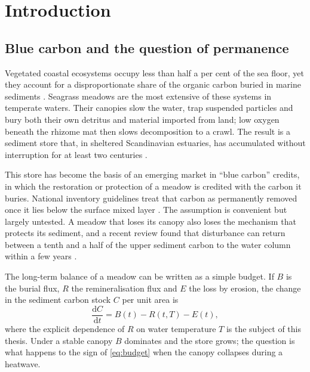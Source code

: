 \chapter{Introduction}
\label{ch:introduction}


\section{Blue carbon and the question of permanence}
\label{sec:permanence}

Vegetated coastal ecosystems occupy less than half a per cent of the sea
floor, yet they account for a disproportionate share of the organic
carbon buried in marine sediments \parencite{rowan2017seagrass}. Seagrass
meadows are the most extensive of these systems in temperate waters. Their
canopies slow the water, trap suspended particles and bury both their own
detritus and material imported from land; low oxygen beneath the rhizome
mat then slows decomposition to a crawl. The result is a sediment store
that, in sheltered Scandinavian estuaries, has accumulated without
interruption for at least two centuries \parencite{holmgren2019burial}.

This store has become the basis of an emerging market in \enquote{blue
carbon} credits, in which the restoration or protection of a meadow is
credited with the carbon it buries. National inventory guidelines treat
that carbon as permanently removed once it lies below the surface mixed
layer \parencite{bcwg2023guidelines}. The assumption is convenient but
largely untested. A meadow that loses its canopy also loses the
mechanism that protects its sediment, and a recent review found that
disturbance can return between a tenth and a half of the upper sediment
carbon to the water column within a few years
\parencite{fairbairn2022permanence}.

The long-term balance of a meadow can be written as a simple budget. If
\(B\) is the burial flux, \(R\) the remineralisation flux and \(E\) the
loss by erosion, the change in the sediment carbon stock \(C\) per unit
area is
\begin{equation}
  \frac{\mathrm{d}C}{\mathrm{d}t} = B(t) - R(t, T) - E(t),
  \label{eq:budget}
\end{equation}
where the explicit dependence of \(R\) on water temperature \(T\) is the
subject of this thesis. Under a stable canopy \(B\) dominates and the
store grows; the question is what happens to the sign of
\cref{eq:budget} when the canopy collapses during a heatwave.

